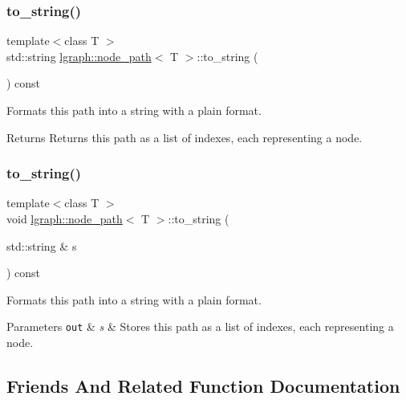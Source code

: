 \subsubsection{\texorpdfstring{to\+\_\+string()}{to\_string()}\hspace{0.1cm}{\footnotesize\ttfamily [1/2]}}
{\footnotesize\ttfamily template$<$class T $>$ \\
std\+::string \hyperlink{classlgraph_1_1node__path}{lgraph\+::node\+\_\+path}$<$ T $>$\+::to\+\_\+string (\begin{DoxyParamCaption}{ }\end{DoxyParamCaption}) const}



Formats this path into a string with a plain format. 

\begin{DoxyReturn}{Returns}
Returns this path as a list of indexes, each representing a node. 
\end{DoxyReturn}
\mbox{\label{classlgraph_1_1node__path_a98545a3a8698bf193f09636829562f0f}} 
\subsubsection{\texorpdfstring{to\+\_\+string()}{to\_string()}\hspace{0.1cm}{\footnotesize\ttfamily [2/2]}}
{\footnotesize\ttfamily template$<$class T $>$ \\
void \hyperlink{classlgraph_1_1node__path}{lgraph\+::node\+\_\+path}$<$ T $>$\+::to\+\_\+string (\begin{DoxyParamCaption}\item[{std\+::string \&}]{s }\end{DoxyParamCaption}) const}



Formats this path into a string with a plain format. 


\begin{DoxyParams}[1]{Parameters}
\mbox{\tt out}  & {\em s} & Stores this path as a list of indexes, each representing a node. \\
\hline
\end{DoxyParams}


\subsection{Friends And Related Function Documentation}
\mbox{\label{classlgraph_1_1node__path_a97671ba034a7baa54df38ba323d7a48e}} 
